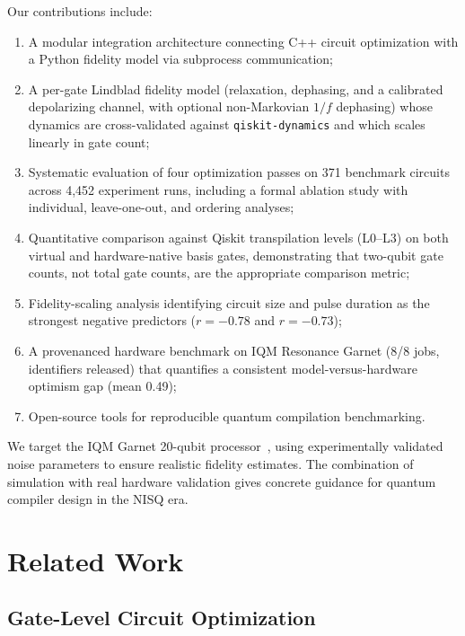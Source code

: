 \documentclass[sigconf,nonacm]{acmart}
\begin{document}
Our contributions include:
\begin{enumerate}
    \item A modular integration architecture connecting C++ circuit optimization with a Python fidelity model via subprocess communication;
    \item A per-gate Lindblad fidelity model (relaxation, dephasing, and a calibrated depolarizing channel, with optional non-Markovian $1/f$ dephasing) whose dynamics are cross-validated against \texttt{qiskit-dynamics} and which scales linearly in gate count;
    \item Systematic evaluation of four optimization passes on 371 benchmark circuits across 4{,}452 experiment runs, including a formal ablation study with individual, leave-one-out, and ordering analyses;
    \item Quantitative comparison against Qiskit transpilation levels (L0--L3) on both virtual and hardware-native basis gates, demonstrating that two-qubit gate counts, not total gate counts, are the appropriate comparison metric;
    \item Fidelity-scaling analysis identifying circuit size and pulse duration as the strongest negative predictors ($r = -0.78$ and $r = -0.73$);
    \item A provenanced hardware benchmark on IQM Resonance Garnet (8/8 jobs, identifiers released) that quantifies a consistent model-versus-hardware optimism gap (mean 0.49);
    \item Open-source tools for reproducible quantum compilation benchmarking.
\end{enumerate}

We target the IQM Garnet 20-qubit processor~\cite{iqm2024garnet}, using experimentally validated noise parameters to ensure realistic fidelity estimates. The combination of simulation with real hardware validation gives concrete guidance for quantum compiler design in the NISQ era.

\section{Related Work}
\label{sec:related}

\subsection{Gate-Level Circuit Optimization}
\end{document}
